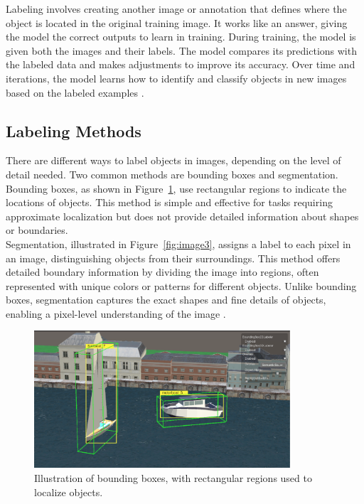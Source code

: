 \noindent Labeling involves creating another image or annotation that defines where the object is located in the original training image. It works like an answer, giving the model the correct outputs to learn in training. During training, the model is given both the images and their labels. The model compares its predictions with the labeled data and makes adjustments to improve its accuracy. Over time and iterations, the model learns how to identify and classify objects in new images based on the labeled examples \cite{Labelling}.


\subsection{Labeling Methods}

There are different ways to label objects in images, depending on the level of detail needed. Two common methods are bounding boxes and segmentation.\\

\noindent Bounding boxes, as shown in Figure~\ref{fig:image2}, use rectangular regions to indicate the locations of objects. This method is simple and effective for tasks requiring approximate localization but does not provide detailed information about shapes or boundaries.\\

\noindent Segmentation, illustrated in Figure~\ref{fig:image3}, assigns a label to each pixel in an image, distinguishing objects from their surroundings. This method offers detailed boundary information by dividing the image into regions, often represented with unique colors or patterns for different objects. Unlike bounding boxes, segmentation captures the exact shapes and fine details of objects, enabling a pixel-level understanding of the image \cite{labelingMethods}.\

\begin{figure}[H]
    \centering
    \includegraphics[width=0.85\textwidth]{Figures/boundingbox.png}
    \caption{Illustration of bounding boxes, with rectangular regions used to localize objects.}
    \label{fig:image2}
\end{figure}

